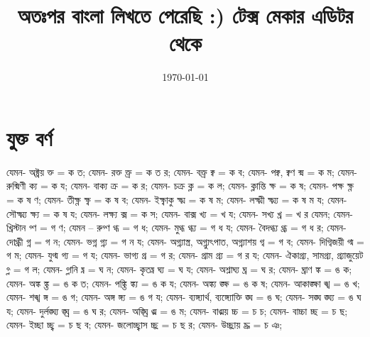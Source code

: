 \documentclass[10pt]{article}
\title{অতঃপর বাংলা লিখতে পেরেছি :) টেক্স মেকার এডিটর থেকে }
\date{\today}
\begin{document}
\maketitle

\section{যুক্ত বর্ণ} যেমন- অক্ট্রয় ক্ত = ক ত;
                    যেমন- রক্ত ক্ত্র = ক ত র;
                    যেমন- বক্ত্র ক্ব = ক ব;
                    যেমন- পক্ব, ক্বণ ক্ম = ক ম;
                    যেমন- রুক্মিণী ক্য = ক য;
                    যেমন- বাক্য ক্র = ক র;
                    যেমন- চক্র ক্ল = ক ল;
                    যেমন- ক্লান্তি ক্ষ = ক ষ;
                    যেমন- পক্ষ ক্ষ্ণ = ক ষ ণ;
                    যেমন- তীক্ষ্ণ ক্ষ্ব = ক ষ ব;
                    যেমন- ইক্ষ্বাকু ক্ষ্ম = ক ষ ম;
                    যেমন- লক্ষ্মী ক্ষ্ম্য = ক ষ ম য;
                    যেমন- সৌক্ষ্ম্য ক্ষ্য = ক ষ য;
                    যেমন- লক্ষ্য ক্স = ক স;
                    যেমন- বাক্স খ্য = খ য;
                    যেমন- সখ্য খ্র = খ র যেমন;
                    যেমন- খ্রিস্টান গ্ণ = গ ণ; যেমন – রুগ্ণ গ্ধ = গ ধ;
                    যেমন- মুগ্ধ গ্ধ্য = গ ধ য;
                    যেমন- বৈদগ্ধ্য গ্ধ্র = গ ধ র;
                    যেমন- দোগ্ধ্রী গ্ন = গ ন;
                    যেমন- ভগ্ন গ্ন্য = গ ন য;
                    যেমন- অগ্ন্যাস্ত্র, অগ্ন্যুৎপাত, অগ্ন্যাশয় গ্ব = গ ব;
                    যেমন- দিগ্বিজয়ী গ্ম = গ ম;
                    যেমন- যুগ্ম গ্য = গ য;
                    যেমন- ভাগ্য গ্র = গ র;
                    যেমন- গ্রাম গ্র্য = গ র য;
                    যেমন- ঐকাগ্র্য, সামগ্র্য, গ্র্যাজুয়েট গ্ল = গ ল;
                    যেমন- গ্লানি ঘ্ন = ঘ ন;
                    যেমন- কৃতঘ্ন ঘ্য = ঘ য;
                    যেমন- অশ্লাঘ্য ঘ্র = ঘ র;
                    যেমন- ঘ্রাণ ঙ্ক = ঙ ক;
                    যেমন- অঙ্ক ঙ্ক্ত = ঙ ক ত;
                    যেমন- পঙ্ক্তি ঙ্ক্য = ঙ ক য;
                    যেমন- অঙ্ক্য ঙ্ক্ষ = ঙ ক ষ;
                    যেমন- আকাঙ্ক্ষা ঙ্খ = ঙ খ;
                    যেমন- শঙ্খ ঙ্গ = ঙ গ;
                    যেমন- অঙ্গ ঙ্গ্য = ঙ গ য;
                    যেমন- ব্যঙ্গ্যার্থ, ব্যঙ্গ্যোক্তি ঙ্ঘ = ঙ ঘ;
                    যেমন- সঙ্ঘ ঙ্ঘ্য = ঙ ঘ য;
                    যেমন- দুর্লঙ্ঘ্য ঙ্ঘ্র = ঙ ঘ র;
                    যেমন- অঙ্ঘ্রি ঙ্ম = ঙ ম;
                    যেমন- বাঙ্ময় চ্চ = চ চ;
                    যেমন- বাচ্চা চ্ছ = চ ছ;
                    যেমন- ইচ্ছা চ্ছ্ব = চ ছ ব;
                    যেমন- জলোচ্ছ্বাস চ্ছ্র = চ ছ র;
                    যেমন- উচ্ছ্রায় চ্ঞ = চ ঞ;
\end{document}
